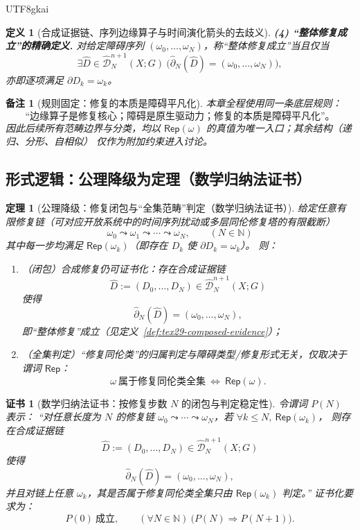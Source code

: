 \documentclass[12pt]{article}
\newtheorem{definition}{定义}[section]
\newtheorem{theorem}{定理}[section]
\newtheorem{remark}{备注}[section]
\newtheorem{Certificate}{证书}[section]
\newcommand{\NN}{\mathbb{N}}
\begin{document}
\begin{CJK*}{UTF8}{gkai}
\begin{definition}[合成证据链、序列边缘算子与时间演化箭头的去歧义]
\textbf{(4) “整体修复成立”的精确定义.}
对给定障碍序列 $(\omega_0,\dots,\omega_N)$，称“整体修复成立”当且仅当
\[
  \exists \widehat{D}\in\widehat{\mathcal{D}}^{n+1}_N(X;G)\ \bigl(\widehat{\partial}_N(\widehat{D})=(\omega_0,\dots,
    \omega_N)\bigr),
\]
亦即逐项满足 $\partial D_k=\omega_k$。
\end{definition}

\begin{remark}[规则固定：修复的本质是障碍平凡化]
本章全程使用同一条底层规则：
\[
  \text{“边缘算子是修复核心；障碍是原生驱动力；修复的本质是障碍平凡化”。}
\]
因此后续所有范畴边界与分类，均以 $\mathsf{Rep}(\omega)$ 的真值为唯一入口；其余结构（递归、分形、自相似）
仅作为\emph{附加约束}进入讨论。
\end{remark}

\subsection{形式逻辑：公理降级为定理（数学归纳法证书）}
\label{subsec:tex29-axiom-downgraded}

\begin{theorem}[公理降级：修复闭包与“全集范畴”判定（数学归纳法证书）]
\label{thm:tex29-axiom-downgraded}
给定任意有限修复链（可对应开放系统中的时间序列扰动或多层同伦修复塔的有限截断）
\[
  \omega_0 \leadsto \omega_1 \leadsto \cdots \leadsto \omega_N,
  \qquad (N\in\NN)
\]
其中每一步均满足 $\mathsf{Rep}(\omega_k)$（即存在 $D_k$ 使 $\partial D_k=\omega_k$）。
则：
\begin{enumerate}
  \item （闭包）合成修复仍可证书化：存在合成证据链
  \[
    \widehat{D}:=(D_0,\dots,D_N)\in\widehat{\mathcal{D}}^{n+1}_N(X;G)
  \]
  使得
  \[
    \widehat{\partial}_N(\widehat{D})=(\omega_0,\dots,\omega_N),
  \]
  即“整体修复”成立（见定义~\ref{def:tex29-composed-evidence}）；
  \item （全集判定）“修复同伦类”的归属判定与障碍类型/修复形式无关，仅取决于谓词 $\mathsf{Rep}$：
  \[
    \omega\ \text{属于修复同伦类全集}\ \Longleftrightarrow\ \mathsf{Rep}(\omega).
  \]
\end{enumerate}
\end{theorem}

\begin{Certificate}[数学归纳法证书：按修复步数 $N$ 的闭包与判定稳定性]
\label{cert:tex29-axiom-downgraded}
令谓词 $P(N)$ 表示：
“对任意长度为 $N$ 的修复链 $\omega_0\leadsto\cdots\leadsto\omega_N$，若 $\forall k\le N,\ \mathsf{Rep}(\omega_k)$，
则存在合成证据链
\[
  \widehat{D}:=(D_0,\dots,D_N)\in\widehat{\mathcal{D}}^{n+1}_N(X;G)
\]
使得
\[
  \widehat{\partial}_N(\widehat{D})=(\omega_0,\dots,\omega_N),
\]
并且对链上任意 $\omega_k$，其是否属于修复同伦类全集只由 $\mathsf{Rep}(\omega_k)$ 判定。”
证书化要求为：
\[
  P(0)\ \text{成立},\qquad (\forall N\in\NN)\ \bigl(P(N)\Rightarrow P(N+1)\bigr).
\]
\end{Certificate}


\end{CJK*}
\end{document}
